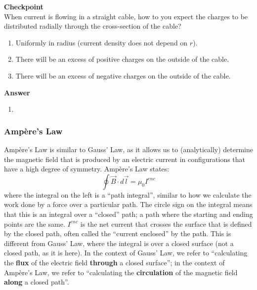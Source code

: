 \begin{framed}
\textbf{Checkpoint}\\
When current is flowing in a straight cable, how to you expect the charges to be distributed radially through the cross-section of the cable?

\begin{enumerate}
\item Uniformly in radius (current density does not depend on $r$).
\item There will be an excess of positive charges on the outside of the cable.
\item There will be an excess of negative charges on the outside of the cable.
\end{enumerate}

\begin{framed}
\textbf{Answer}\\
\begin{enumerate}[resume]
\item
\end{enumerate}
\end{framed}
\end{framed}

\subsubsection{Ampère's Law}

Ampère's Law is similar to Gauss' Law, as it allows us to (analytically) determine the magnetic field that is produced by an electric current in configurations that have a high degree of symmetry. Ampère's Law states:
\begin{equation}
\boxed{\oint \vec B \cdot d\vec l =\mu_0 I^{enc}}
\end{equation}
where the integral on the left is a ``path integral'', similar to how we calculate the work done by a force over a particular path. The circle sign on the integral means that this is an integral over a ``closed'' path; a path where the starting and ending points are the same. $I^{enc}$ is the net current that crosses the surface that is defined by the closed path, often called the ``current enclosed'' by the path. This is different from Gauss' Law, where the integral is over a closed surface (not a closed path, as it is here). In the context of Gauss' Law, we refer to ``calculating the \textbf{flux} of the electric field \textbf{through} a closed surface''; in the context of Ampère's Law, we refer to ``calculating the \textbf{circulation} of the magnetic field \textbf{along} a closed path''.

